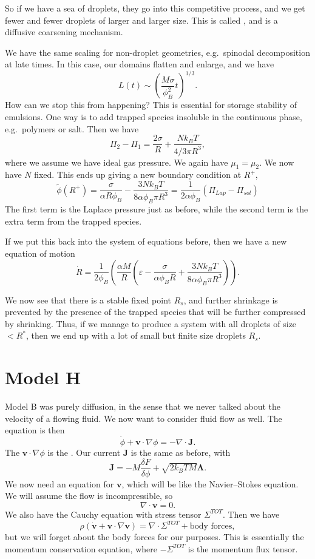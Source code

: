 \documentclass[a4paper]{article}
\begin{document}
So if we have a sea of droplets, they go into this competitive process, and we get fewer and fewer droplets of larger and larger size. This is called , and is a diffusive coarsening mechanism.

We have the same scaling for non-droplet geometries, e.g.\ spinodal decomposition at late times. In this case, our domains flatten and enlarge, and we have
\[
  L(t) \sim \left(\frac{M\sigma}{\phi_B^2} t\right)^{1/3}.
\]
How can we stop this from happening? This is essential for storage stability of emulsions. One way is to add trapped species insoluble in the continuous phase, e.g.\ polymers or salt. Then we have
\[
  \Pi_2 - \Pi_1 = \frac{2\sigma}{R} + \frac{Nk_B T}{4/3 \pi R^3},
\]
where we assume we have ideal gas pressure. We again have $\mu_1 = \mu_2$. We now have $N$ fixed. This ends up giving a new boundary condition at $R^+$,
\[
  \tilde{\phi}(R^+) = \frac{\sigma}{\alpha R \phi_B} - \frac{3N k_B T}{8 \alpha \phi_B \pi R^3} = \frac{1}{2 \alpha \phi_B} (\Pi_{Lap} - \Pi_{sol})
\]
The first term is the Laplace pressure just as before, while the second term is the extra term from the trapped species.

If we put this back into the system of equations before, then we have a new equation of motion
\[
  \dot{R} = \frac{1}{2 \phi_B} \left( \frac{\alpha M}{R} \left(\varepsilon - \frac{\sigma}{\alpha \phi_B R} + \frac{3 N k_B T}{8 \alpha \phi_B \pi R^3}\right)\right).
\]

We now see that there is a stable fixed point $R_s$, and further shrinkage is prevented by the presence of the trapped species that will be further compressed by shrinking. Thus, if we manage to produce a system with all droplets of size $< R^*$, then we end up with a lot of small but finite size droplets $R_s$.

\section{Model H}
Model B was purely diffusion, in the sense that we never talked about the velocity of a flowing fluid. We now want to consider fluid flow as well. The equation is then
\[
  \dot{\phi} + \mathbf{v} \cdot \nabla \phi = - \nabla \cdot \mathbf{J}.
\]
The $\mathbf{v} \cdot \nabla \phi$ is the . Our current $\mathbf{J}$ is the same as before, with
\[
  \mathbf{J} = -M \frac{\delta F}{\delta \phi} + \sqrt{2k_B T M} \boldsymbol\Lambda.
\]
We now need an equation for $\mathbf{v}$, which will be like the Navier--Stokes equation. We will assume the flow is incompressible, so
\[
  \nabla \cdot \mathbf{v} = 0
.\]
We also have the Cauchy equation with stress tensor $\Sigma^{TOT}$. Then we have
\[
  \rho(\dot{\mathbf{v}} + \mathbf{v} \cdot \nabla \mathbf{v}) = \nabla \cdot \Sigma^{TOT} + \text{body forces},
\]
but we will forget about the body forces for our purposes. This is essentially the momentum conservation equation, where $- \Sigma^{TOT}$ is the momentum flux tensor.
\end{document}
